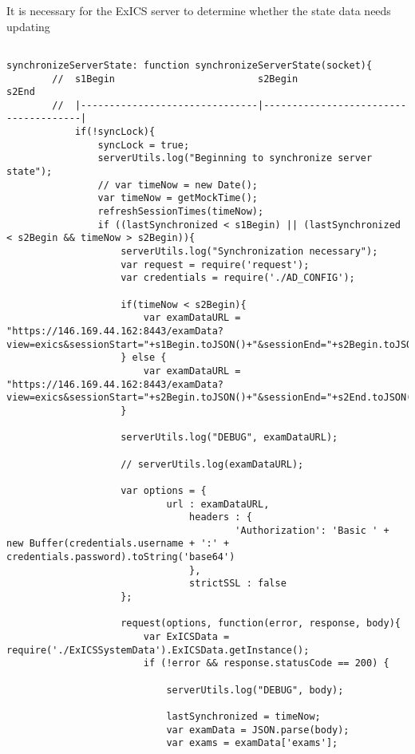 It is necessary for the ExICS server to determine whether the state data needs updating

\lstset{language=JavaScript}
\begin{lstlisting}[captionpos=b,caption=Exam Data Syncronization Method, tabsize=2,
		breaklines=true]

synchronizeServerState: function synchronizeServerState(socket){
		//	s1Begin 						s2Begin								s2End
		//	|-------------------------------|--------------------------------------|
			if(!syncLock){
				syncLock = true;
				serverUtils.log("Beginning to synchronize server state");
				// var timeNow = new Date();
				var timeNow = getMockTime();
				refreshSessionTimes(timeNow);
				if ((lastSynchronized < s1Begin) || (lastSynchronized < s2Begin && timeNow > s2Begin)){
					serverUtils.log("Synchronization necessary");
					var request = require('request');
					var credentials = require('./AD_CONFIG');

					if(timeNow < s2Begin){
						var examDataURL = "https://146.169.44.162:8443/examData?view=exics&sessionStart="+s1Begin.toJSON()+"&sessionEnd="+s2Begin.toJSON();
					} else {
						var examDataURL = "https://146.169.44.162:8443/examData?view=exics&sessionStart="+s2Begin.toJSON()+"&sessionEnd="+s2End.toJSON();
					}

					serverUtils.log("DEBUG", examDataURL);

					// serverUtils.log(examDataURL);

					var options = {
							url : examDataURL,
								headers : {
										'Authorization': 'Basic ' + new Buffer(credentials.username + ':' + credentials.password).toString('base64')
								},
								strictSSL : false      
					};

					request(options, function(error, response, body){
						var ExICSData = require('./ExICSSystemData').ExICSData.getInstance();
						if (!error && response.statusCode == 200) {
							
							serverUtils.log("DEBUG", body);

							lastSynchronized = timeNow;
							var examData = JSON.parse(body);
							var exams = examData['exams'];


\end{lstlisting}
